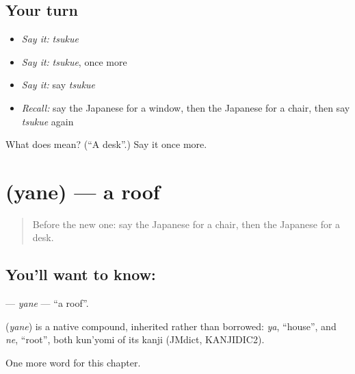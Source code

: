 \subsection*{Your turn}
\begin{itemize}
\raggedright
  \item \emph{Say it:} \emph{tsukue}
  \item \emph{Say it:} \emph{tsukue}, once more
  \item \emph{Say it:} say \emph{tsukue}
  \item \emph{Recall:} say the Japanese for a window, then the Japanese for a chair, then say \emph{tsukue} again
\end{itemize}

\begin{tcolorbox}[breakable,colback=teal!4,colframe=teal!35!black,title={Before you move on}]
What does  mean? (\textquotedblleft{}A desk\textquotedblright{}.) Say it once more.
\end{tcolorbox}
\section[\texorpdfstring{\ja{やね} (yane)}{やね (yane)}]{ (yane) — a roof}

\label{lesson:JA-C37-yane}



\begin{quote}
Before the new one: say the Japanese for a chair, then the Japanese for a desk.
\end{quote}

\subsection*{You'll want to know: }
\textbf{} — \emph{yane} — \textquotedblleft{}a roof\textquotedblright{}.

\begin{cousinweb}
\textbf{} (\emph{yane}) is a native compound, inherited rather than borrowed: \emph{ya}, \textquotedblleft{}house\textquotedblright{}, and \emph{ne}, \textquotedblleft{}root\textquotedblright{}, both kun'yomi of its kanji (JMdict, KANJIDIC2).
\end{cousinweb}

\begin{grammarlens}[title={What you've built}]
One more word for this chapter.
\end{grammarlens}

